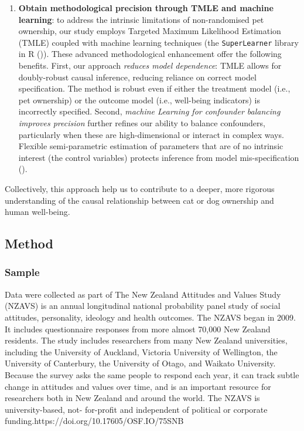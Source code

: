 \documentclass[
  singlecolumn,
  9pt]{article}
\begin{document}
\begin{enumerate}
\item
  \textbf{Obtain methodological precision through TMLE and machine
  learning}: to address the intrinsic limitations of non-randomised pet
  ownership, our study employs Targeted Maximum Likelihood Estimation
  (TMLE) coupled with machine learning techniques (the
  \texttt{SuperLearner} library in R ()). These advanced methodological enhancement offer
  the following benefits. First, our approach \emph{reduces model
  dependence}: TMLE allows for doubly-robust causal inference, reducing
  reliance on correct model specification. The method is robust even if
  either the treatment model (i.e., pet ownership) or the outcome model
  (i.e., well-being indicators) is incorrectly specified. Second,
  \emph{machine Learning for confounder balancing improves precision}
  further refines our ability to balance confounders, particularly when
  these are high-dimensional or interact in complex ways. Flexible
  semi-parametric estimation of parameters that are of no intrinsic
  interest (the control variables) protects inference from model
  mis-specification ().
\end{enumerate}

Collectively, this approach help us to contribute to a deeper, more
rigorous understanding of the causal relationship between cat or dog
ownership and human well-being.

\subsection{Method}\label{method}

\subsubsection{Sample}\label{sample}

Data were collected as part of The New Zealand Attitudes and Values
Study (NZAVS) is an annual longitudinal national probability panel study
of social attitudes, personality, ideology and health outcomes. The
NZAVS began in 2009. It includes questionnaire responses from more
almost 70,000 New Zealand residents. The study includes researchers from
many New Zealand universities, including the University of Auckland,
Victoria University of Wellington, the University of Canterbury, the
University of Otago, and Waikato University. Because the survey asks the
same people to respond each year, it can track subtle change in
attitudes and values over time, and is an important resource for
researchers both in New Zealand and around the world. The NZAVS is
university-based, not- for-profit and independent of political or
corporate funding.https://doi.org/10.17605/OSF.IO/75SNB
\end{document}
